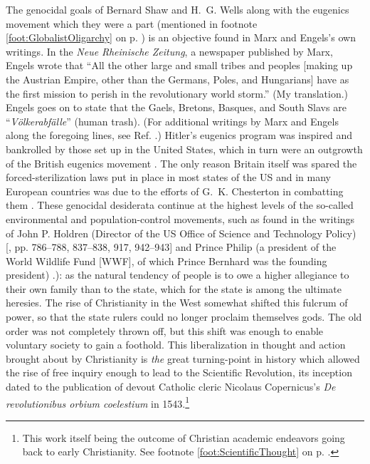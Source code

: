 \documentclass[letterpaper,12pt]{article}
\begin{document}
{    \label{page:Eugenics}The genocidal goals of Bernard Shaw and H.~G. Wells along with the eugenics movement which they were a part (mentioned in footnote \ref{foot:GlobalistOligarchy} on p. \pageref{page:ShawWells}) is an objective found in Marx and Engels's own writings. In the \emph{Neue Rheinische Zeitung}, a newspaper published by Marx, Engels wrote \cite{Engels1849} that ``All the other large and small tribes and peoples [making up the Austrian Empire, other than the Germans, Poles, and Hungarians] have as the first mission to perish in the revolutionary world storm.'' (My translation.) Engels goes on to state that the Gaels, Bretons, Basques, and South Slavs are ``\emph{V\"{o}lkerabf\"{a}lle}'' (human trash). (For additional writings by Marx and Engels along the foregoing lines, see Ref. .) Hitler's eugenics program was inspired and bankrolled by those set up in the United States, which in turn were an outgrowth of the British eugenics movement \cite{Black2003}. The only reason Britain itself was spared the forced-sterilization laws put in place in most states of the US and in many European countries was due to the efforts of G.~K. Chesterton in combatting them \cite{Sparkes1999}. These genocidal desiderata continue at the highest levels of the so-called environmental and population-control movements, such as found in the writings of John P. Holdren (Director of the US Office of Science and Technology Policy) [, pp. 786--788, 837--838, 917, 942--943] and Prince Philip (a president of the World Wildlife Fund [WWF], of which Prince Bernhard was the founding president) \cite{Cowles1987}.}): as the natural tendency of people is to owe a higher allegiance to their own family than to the state, which for the state is among the ultimate heresies. The rise of Christianity in the West somewhat shifted this fulcrum of power, so that the state rulers could no longer proclaim themselves gods. The old order was not completely thrown off, but this shift was enough to enable voluntary society to gain a foothold. This liberalization in thought and action brought about by Christianity is \emph{the} great turning-point in history which allowed the rise of free inquiry enough to lead to the Scientific Revolution, its inception dated to the publication of devout Catholic cleric Nicolaus Copernicus's \emph{De revolutionibus orbium coelestium} in 1543.\footnote{This work itself being the outcome of Christian academic endeavors going back to early Christianity. See footnote \ref{foot:ScientificThought} on p. \pageref{foot:ScientificThought}.}
\end{document}
